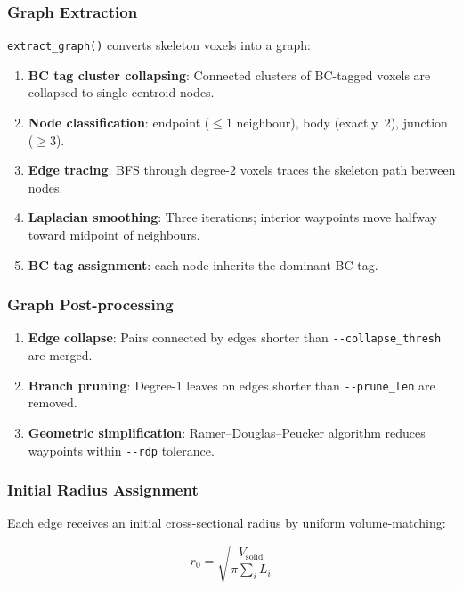 \documentclass[a4paper, 11pt, openany]{report}
\begin{document}
\subsubsection{Graph Extraction}

\texttt{extract\_graph()} converts skeleton voxels into a graph:

\begin{enumerate}[nosep]
    \item \textbf{BC tag cluster collapsing}: Connected clusters of BC-tagged
          voxels are collapsed to single centroid nodes.
    \item \textbf{Node classification}: endpoint ($\le 1$ neighbour), body
          (exactly~2), junction ($\ge 3$).
    \item \textbf{Edge tracing}: BFS through degree-2 voxels traces the skeleton
          path between nodes.
    \item \textbf{Laplacian smoothing}: Three iterations; interior waypoints
          move halfway toward midpoint of neighbours.
    \item \textbf{BC tag assignment}: each node inherits the dominant BC tag.
\end{enumerate}


\subsubsection{Graph Post-processing}

\begin{enumerate}[nosep]
    \item \textbf{Edge collapse}: Pairs connected by edges shorter than
          \texttt{-{}-collapse\_thresh} are merged.
    \item \textbf{Branch pruning}: Degree-1 leaves on edges shorter than
          \texttt{-{}-prune\_len} are removed.
    \item \textbf{Geometric simplification}: Ramer--Douglas--Peucker algorithm
          reduces waypoints within \texttt{-{}-rdp} tolerance.
\end{enumerate}


\subsubsection{Initial Radius Assignment}

Each edge receives an initial cross-sectional radius by uniform volume-matching:

\begin{equation}
\label{eq:radius-init}
r_0 = \sqrt{\frac{V_{\text{solid}}}{\pi \sum_i L_i}}
\end{equation}
\end{document}
